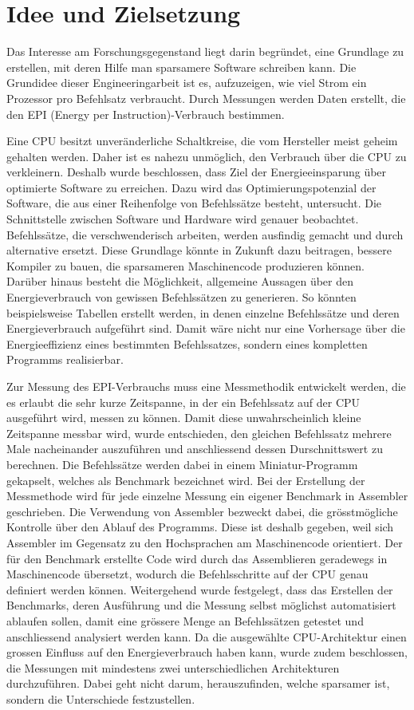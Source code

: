 \chapter{Idee und Zielsetzung}



Das Interesse am Forschungsgegenstand liegt darin begründet, eine Grundlage zu erstellen, mit deren Hilfe man sparsamere Software schreiben kann. Die Grundidee dieser Engineeringarbeit ist es, aufzuzeigen, wie viel Strom ein Prozessor pro Befehlsatz verbraucht. Durch Messungen werden Daten erstellt, die den EPI (Energy per Instruction)-Verbrauch bestimmen.
\par 
Eine CPU besitzt unveränderliche Schaltkreise, die vom Hersteller meist geheim gehalten werden. Daher ist es nahezu unmöglich, den Verbrauch über die CPU zu verkleinern. Deshalb wurde beschlossen, dass Ziel der Energieeinsparung über optimierte Software zu erreichen. Dazu wird das Optimierungspotenzial der Software, die aus einer Reihenfolge von Befehlssätze besteht, untersucht. Die Schnittstelle zwischen Software und Hardware wird genauer beobachtet. Befehlssätze, die verschwenderisch arbeiten, werden ausfindig gemacht und durch alternative ersetzt. Diese Grundlage könnte in Zukunft dazu beitragen, bessere Kompiler zu bauen, die sparsameren Maschinencode produzieren können. Darüber hinaus besteht die Möglichkeit, allgemeine Aussagen über den Energieverbrauch von gewissen Befehlssätzen zu generieren. So könnten beispielsweise Tabellen erstellt werden, in denen einzelne Befehlssätze und deren Energieverbrauch aufgeführt sind. Damit wäre nicht nur eine Vorhersage über die Energieeffizienz eines bestimmten Befehlssatzes, sondern eines kompletten Programms realisierbar.  
\par
Zur Messung des EPI-Verbrauchs muss eine Messmethodik entwickelt werden, die es erlaubt die sehr kurze Zeitspanne, in der ein Befehlssatz auf der CPU ausgeführt wird, messen zu können. Damit diese unwahrscheinlich kleine Zeitspanne messbar wird, wurde entschieden, den gleichen Befehlssatz mehrere Male nacheinander auszuführen und anschliessend dessen Durschnittswert zu berechnen. Die Befehlssätze werden dabei in einem Miniatur-Programm gekapselt, welches als Benchmark bezeichnet wird. Bei der Erstellung der Messmethode wird für jede einzelne Messung ein eigener Benchmark in Assembler geschrieben. Die Verwendung von Assembler bezweckt dabei, die grösstmögliche Kontrolle über den Ablauf des Programms. Diese ist deshalb gegeben, weil sich Assembler im Gegensatz zu den Hochsprachen am Maschinencode orientiert. Der für den Benchmark erstellte Code wird durch das Assemblieren geradewegs in Maschinencode übersetzt, wodurch die Befehlsschritte auf der CPU genau definiert werden können. Weitergehend wurde festgelegt, dass das Erstellen der Benchmarks, deren Ausführung und die Messung selbst möglichst automatisiert ablaufen sollen, damit eine grössere Menge an Befehlssätzen getestet und anschliessend analysiert werden kann. Da die ausgewählte CPU-Architektur einen grossen Einfluss auf den Energieverbrauch haben kann, wurde zudem beschlossen, die Messungen mit mindestens zwei unterschiedlichen Architekturen durchzuführen. Dabei geht nicht darum, herauszufinden, welche sparsamer ist, sondern die Unterschiede festzustellen. 

